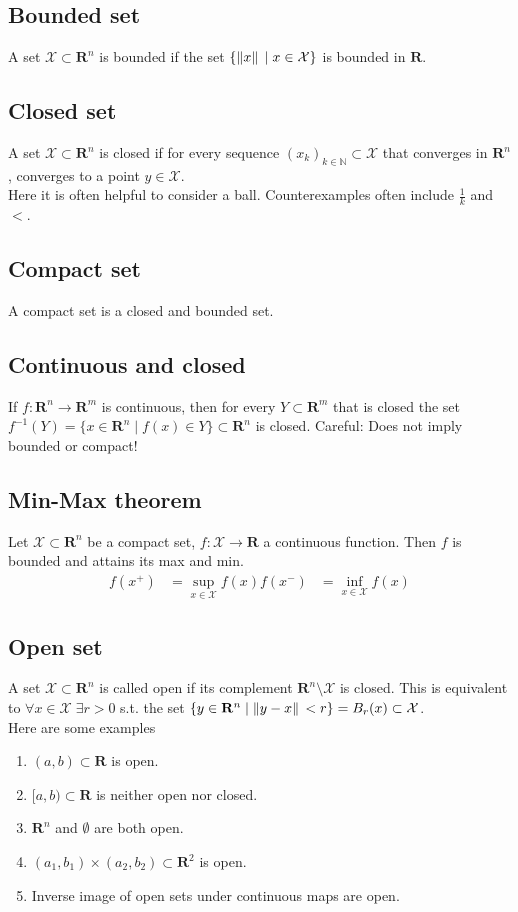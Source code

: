 \documentclass[8pt]{extarticle}
\newcommand{\R}{{\mathbb R}}
\newcommand{\X}{{\mathcal X}}
\newcommand{\ra}{{\rightarrow}}
\def\R{\mathbf{R}}
\begin{document}
\begin{multicols*}{3}
  \subsection{Bounded set}
  A set $\X \subset \R^n$ is bounded if the set
  $\{ \norm*{x} \;|\; x \in \X\}$ is bounded in $\R$.
  \subsection{Closed set}
  A set $\X \subset \R^n$ is closed if for every
  sequence $(x_k)_{k \in \mathbb{N}} \subset \X$ that
  converges in $\R^n$, converges to a point $y \in \X$.\\
  Here it is often helpful to consider a ball. Counterexamples often include
  $\frac{1}{k}$ and $<$.
  \subsection{Compact set}
  A compact set is a closed and bounded set.
  \subsection{Continuous and closed}
  If $f: \R^n \ra \R^m$ is continuous, then for
  every $Y \subset \R^m$ that is closed the set
  $f^{-1}(Y) = \{x \in \R^n \;|\; f(x) \in Y\} \subset \R^n$
  is closed. Careful: Does not imply bounded or compact!
  \subsection{Min-Max theorem}
  Let $\X \subset \R^n$ be a compact set,
  $f: \X \ra \R$ a continuous function.
  Then $f$ is bounded and attains its max and min.
  \begin{align*}
    f(x^+) & = \sup_{x \in \X} f(x)
    f(x^-) & = \inf_{x \in \X} f(x)
  \end{align*}
  \subsection{Open set}
  A set $\X \subset \R^n$ is called open if its
  complement $\R^n \setminus \X$ is closed.
  This is equivalent to $\forall x \in \X \; \exists r > 0$
  s.t. the set
  $\{y \in \R^n \;|\; \norm*{y - x} < r\} = B_r(x) \subset \X$.\\
  Here are some examples
  \begin{enumerate}[label=(\arabic*)]
    \item $(a, b) \subset \R$ is open.
    \item $[a, b) \subset \R$ is neither open nor closed.
    \item $\R^n$ and $\emptyset$ are both open.
    \item $(a_1, b_1) \times (a_2, b_2) \subset \R^2$ is open.
    \item Inverse image of open sets under continuous maps are open.
  \end{enumerate}

\end{multicols*}
\end{document}
